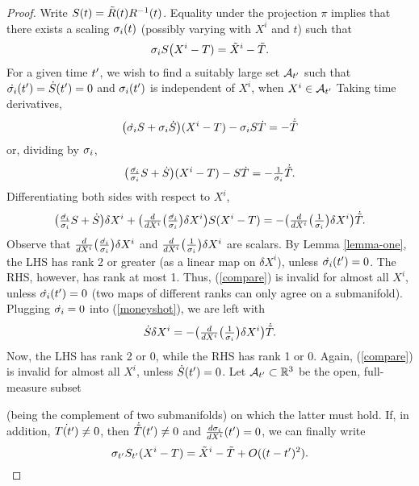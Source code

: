 \begin{proof}
Write $S(t) = \tilde{R}(t)R^{-1}(t)$.
Equality under the projection $\pi$ implies that there exists a scaling $\sigma_{i}(t)$
(possibly varying with $X^i$ and $t$) 
such that
\begin{equation}\sigma_{i} S\bigl(X^i-T)  = \tilde{X}^i-\tilde{T}. \label{finalform}\end{equation}
For a given time $t^{\prime}$, 
we wish to find a suitably large set $\mathcal{A}_{t^{\prime}}$ such that
$\dot{\sigma_{i}}(t^{\prime})=\dot S(t^{\prime})=0$ and $\sigma_{i}(t^{\prime})$ is independent of $X^i$, when $X^i\in\mathcal{A}_{t^{\prime}}$
Taking time derivatives,
$$
\bigl({\dot{\sigma_{i}}}S + \sigma_{i}\dot{S}\bigr)(X^i-T) - \sigma_{i} S\dot{T}
= - \dot{\tilde{T}}
$$
or, dividing by $\sigma_{i}$,
\begin{align}
\bigl(\tfrac{\dot{\sigma_{i}}}{\sigma_{i}}S + \dot{S}\bigr)(X^i-T) - S\dot{T}
= - \tfrac{1}{\sigma_{i}}\dot{\tilde{T}}.
\label{compare}
\end{align}
Differentiating both sides with respect to $X^i$,
\begin{equation}
\bigl(\tfrac{\dot{\sigma_{i}}}{\sigma_{i}}S + \dot {S}\bigr)\delta X^i +
 \bigl(\tfrac{d}{dX^i}\bigl(\tfrac{\dot {\sigma_{i}}}{\sigma_{i}}\bigr)\delta X^i\bigr) S(X^i-T) =
-\bigl(\tfrac{d}{dX^i}\bigl(\tfrac{1}{\sigma_{i}}\bigr)\delta X^i\bigr)\dot{\tilde{T}}. \label{moneyshot}
\end{equation}
Observe that
$\tfrac{d}{dX^i}\bigl(\tfrac{\dot {\sigma_{i}}}{\sigma_{i}}\bigr)\delta X^i$ and
$\tfrac{d}{dX^i}\bigl(\tfrac{1}{\sigma_{i}}\bigr)\delta X^i$
are scalars. 
By Lemma \ref{lemma-one}, the LHS 
has rank 2 or greater (as a linear map on $\delta X^i$), unless $\dot {\sigma_{i}}(t^{\prime})=0$.  
The RHS, however, has rank at most 1.  
Thus, (\ref{compare})
is invalid for almost all $X^i$, unless $\dot {\sigma_{i}}(t^{\prime})=0$
(two maps of different ranks can only agree on a submanifold).
Plugging $\dot {\sigma_{i}}=0$ into (\ref{moneyshot}), we are left with
\begin{equation}
\dot {S}\delta X^i =
-\bigl(\tfrac{d}{dX^i}\bigl(\tfrac{1}{\sigma_i}\bigr)\delta X^i\bigr)\dot {\tilde{T}}. \label{Double-moneyshot}
\end{equation}
Now, the LHS 
has rank 2 or 0, while the RHS has rank 1 or 0.
Again, (\ref{compare}) is invalid for almost all $X^i$, unless 
$\dot {S}(t^{\prime})=0$.
Let $\mathcal{A}_{t^{\prime}}\subset\mathbb{R}^3$ be the open, full-measure subset  (being the complement of two submanifolds) on which the latter must hold.
If, in addition, $\dot {T(t^{\prime})}\neq 0$, then $\dot{\tilde{T}}(t^{\prime})\neq 0$ and
$\frac{d\sigma_i}{dX^i}(t^{\prime})=0$,
we can finally write %
$$
\sigma_{t^{\prime}} S_{t^{\prime}} (X^i - T) = \tilde{X}^i-\tilde{T} + O((t-t^{\prime})^2).
$$
\end{proof}


